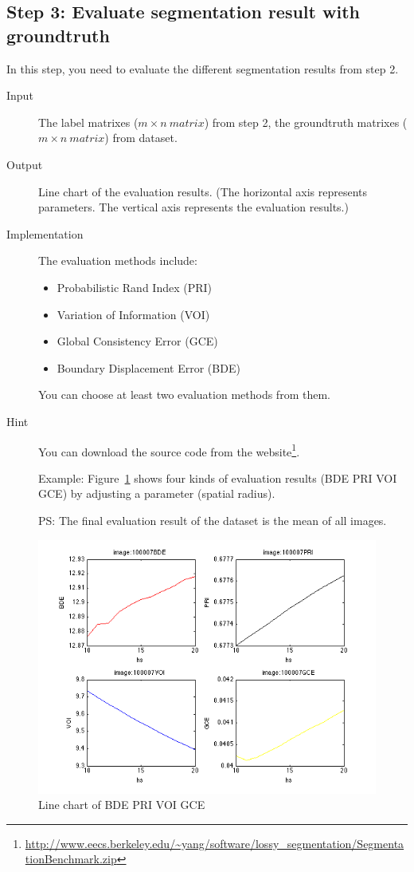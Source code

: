 \documentclass[12pt]{article}
\begin{document}
\subsection{Step 3: Evaluate segmentation result with groundtruth}\label{step:3}

In this step, you need to evaluate the different segmentation results from step 2.
\begin{description}
\item[Input] The label matrixes ($m \times n~matrix$) from step 2, the groundtruth matrixes ($m \times n~matrix$) from dataset.
\item[Output] Line chart of the evaluation results. (The horizontal axis represents parameters. The vertical axis represents the evaluation results.)
\item[Implementation] The evaluation methods include: 
    \begin{itemize}
        \item Probabilistic Rand Index (PRI)
        \item Variation of Information (VOI)
        \item Global Consistency Error (GCE)
        \item Boundary Displacement Error (BDE)
    \end{itemize}
You can choose at least two evaluation methods from them.


\item[Hint] You can download the source code from the website\footnote{\url{http://www.eecs.berkeley.edu/~yang/software/lossy_segmentation/SegmentationBenchmark.zip}}.

Example: Figure~\ref{fig:eval} shows four kinds of evaluation results (BDE PRI VOI GCE) by adjusting a parameter (spatial radius).

{\color{blue}PS}: The final evaluation result of the dataset is the mean of all images.
\end{description}
    \begin{figure}
      \centering
      \includegraphics[width=0.45\linewidth]{eval.png} 
      \caption{Line chart of BDE PRI VOI GCE}
      \label{fig:eval} %
    \end{figure}
\end{document}
